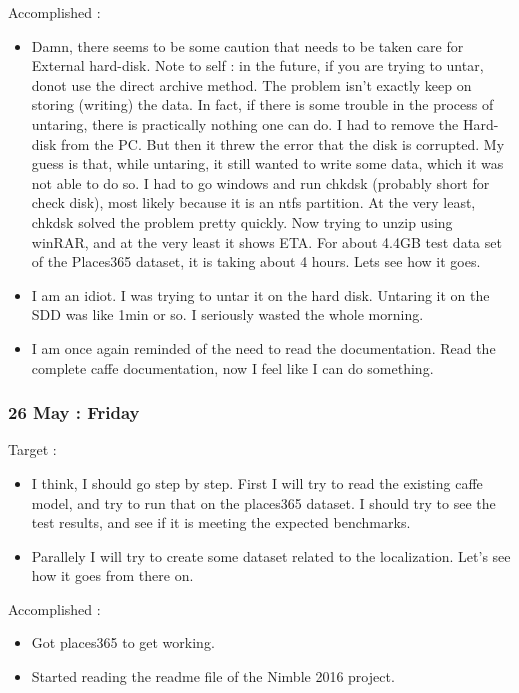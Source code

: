 \documentclass{article}
\begin{document}
Accomplished :
\begin{itemize}
\item Damn, there seems to be some caution that needs to be taken care for External hard-disk. Note to self : in the future, if you are trying to untar, donot use the direct archive method. The problem isn't exactly keep on storing (writing) the data. In fact, if there is some trouble in the process of untaring, there is practically nothing one can do. I had to remove the Hard-disk from the PC. But then it threw the error that the disk is corrupted. My guess is that, while untaring, it still wanted to write some data, which it was not able to do so. I had to go windows and run chkdsk (probably short for check disk), most likely because it is an ntfs partition. At the very least, chkdsk solved the problem pretty quickly. Now trying to unzip using winRAR, and at the very least it shows ETA. For about 4.4GB test data set of the Places365 dataset, it is taking about 4 hours. Lets see how it goes.
\item I am an idiot. I was trying to untar it on the hard disk. Untaring it on the SDD was like 1min or so. I seriously wasted the whole morning.
\item I am once again reminded of the need to read the documentation. Read the complete caffe documentation, now I feel like I can do something. 
\end{itemize}

\subsubsection{26 May : Friday}
Target : 
\begin{itemize}
\item I think, I should go step by step. First I will try to read the existing caffe model, and try to run that on the places365 dataset. I should try to see the test results, and see if it is meeting the expected benchmarks.
\item Parallely I will try to create some dataset related to the localization. Let's see how it goes from there on.
\end{itemize}

Accomplished :
\begin{itemize}
\item Got places365 to get working.
\item Started reading the readme file of the Nimble 2016 project.
\end{itemize}
\end{document}

